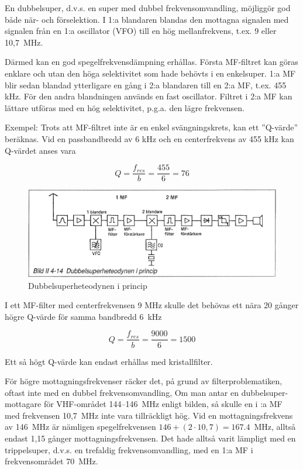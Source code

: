 En dubbelsuper, d.v.s. en super med dubbel frekvensomvandling,
möjliggör god både när- och förselektion. I 1:a blandaren blandas den
mottagna signalen med signalen från en 1:a oscillator (VFO) till en
hög mellanfrekvens, t.ex. 9 eller 10,7~MHz.

Därmed kan en god spegelfrekvensdämpning erhållas. Första MF-filtret
kan göras enklare och utan den höga selektivitet som hade behövts i en
enkelsuper. 1:a MF blir sedan blandad ytterligare en gång i 2:a
blandaren till en 2:a MF, t.ex. 455 kHz. För den andra blandningen
används en fast oscillator. Filtret i 2:a MF kan lättare utföras med
en hög selektivitet, p.g.a. den lägre frekvensen.

Exempel: Trots att MF-filtret inte är en enkel svängningskrets, kan
ett ''Q-värde'' beräknas. Vid en passbandbredd av 6 kHz och en
centerfrekvens av 455 kHz kan Q-värdet anses vara

\[ Q = \frac{f_{res}}{b} = \frac{455}{6} = 76 \]

\begin{figure}
  \includegraphics[width=\textwidth]{images/bild_2_4-14}
  \caption{Dubbelsuperheteodynen i princip}
  \label{fig:bildII4-14}
\end{figure}

I ett MF-filter med centerfrekvensen 9
MHz skulle det behövas ett nära 20 gånger
högre Q-värde för samma bandbredd 6~kHz

\[ Q = \frac{f_{res}}{b} = \frac{9000}{6} = 1500 \]

Ett så högt Q-värde kan endast erhållas med kristallfilter.

För högre mottagningsfrekvenser räcker det, på grund av
filterproblematiken, oftast inte med en dubbel frekvensomvandling, Om
man antar en dubbelsuper-mottagare för VHF-området 144--146~MHz enligt
bilden, så skulle en i :a MF med frekvensen 10,7~MHz inte vara
tillräckligt hög. Vid en mottagningsfrekvens av 146~MHz är nämligen
spegelfrekvensen \(146 + (2 \cdot 10,7) = 167.4\)~MHz, alltså endast
1,15 gånger mottagningsfrekvensen. Det hade alltså varit lämpligt med
en trippelsuper, d.v.s. en trefaldig frekvensomvandling, med en 1:a
MF i frekvensområdet 70~MHz.

